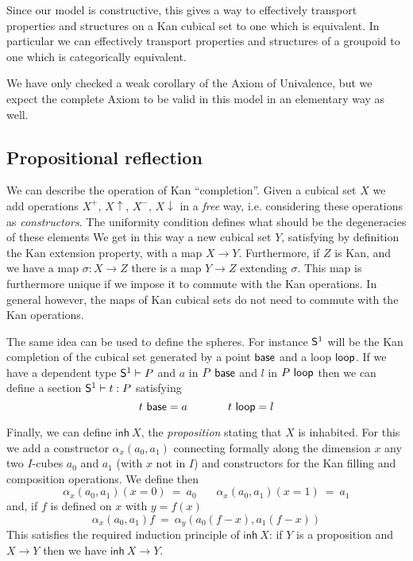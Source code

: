 \documentclass[10pt,a4paper]{article}
\newcommand{\inh}{\mathsf{inh}}
\newcommand{\Sph}{{\sf S}^1}
\begin{document}
\medskip

 Since our model is constructive, this gives a way to effectively transport properties and structures
on a Kan cubical set to one which is equivalent. In particular we can effectively transport properties
and structures of a groupoid to one which is categorically equivalent.

\medskip

 We have only checked a weak corollary of the Axiom of Univalence, but we expect the complete Axiom to be valid
in this model in an elementary way as well.


\subsection{Propositional reflection}

 We can describe the operation of Kan ``completion''. Given a cubical set $X$ we add
operations $X^+$, $X\uparrow$, $X^-$, $X\downarrow$ in a {\em free} way, i.e.
considering these operations as {\em constructors}.
 The uniformity condition defines what should be the degeneracies of these elements
We get in this way a new cubical set $Y$, satisfying by definition the Kan extension
property, with a map $X\to Y$. Furthermore, if $Z$ is Kan, and we have a map
$\sigma:X\to Z$ there is a map $Y\to Z$ extending $\sigma$.
This map is furthermore unique if we impose
it to commute with the Kan  operations.
In general however, the maps of Kan cubical sets do not need to commute with the Kan operations.

 The same idea can be used to define the spheres. For instance $\Sph$ will be the
Kan completion of the cubical set generated by a point ${\sf base}$ and a loop ${\sf loop}$.
If we have a dependent type $\Sph\vdash P$ and $a$ in $P~{\sf base}$ and $l$ in $P~{\sf loop}$
then we can define a section $\Sph\vdash t:P$ satisfying
$$
t~{\sf base} = a~~~~~~~~~~~t~{\sf loop} = l
$$

 Finally, we can define $\inh~X$, the {\em proposition} stating that $X$ is inhabited.
For this we add a constructor $\alpha_x(a_0,a_1)$ connecting formally along the dimension $x$
any two $I$-cubes  $a_0$ and $a_1$ (with $x$ not in $I$) and constructors for the Kan filling
and composition operations. We define then
$$\alpha_x(a_0,a_1)(x=0) ~=~ a_0~~~~~~~~\alpha_x(a_0,a_1)(x=1) ~=~ a_1$$
and, if $f$ is defined on $x$ with $y=f(x)$
$$\alpha_x(a_0,a_1)f ~=~ \alpha_y(a_0(f-x),a_1(f-x))$$
 This satisfies the required induction principle of $\inh~X$: if $Y$ is a proposition
and $X\to Y$ then we have $\inh~X\to Y$.
\end{document}
